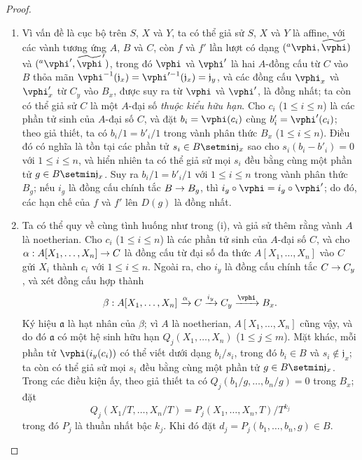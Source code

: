 \documentclass[oneside]{amsart}
\makeatletter
\renewcommand{\leq}{\leqslant}
\newcommand{\ega@arrow}[2]{\mathchoice{#1}{#2}{#2}{#2}}
\renewcommand{\to}{\ega@arrow{\longrightarrow}{\rightarrow}}
\makeatother
\begin{document}
\begin{proof}
\medskip\noindent
\begin{enumerate}
  \item[(i)] Vì vấn đề là cục bộ trên $S$, $X$ và $Y$, ta có thể giả sử $S$, $X$ và $Y$ là affine, với các vành tương ứng $A$, $B$ và $C$, còn $f$ và $f'$ lần lượt có dạng $({}^a\vphi,\widetilde{\vphi})$ và $({}^a\vphi',\widetilde{\vphi}')$, trong đó $\vphi$ và $\vphi'$ là hai $A$-đồng cấu từ $C$ vào $B$ thỏa mãn $\vphi^{-1}(\mathfrak{j}_x)=\vphi'^{-1}(\mathfrak{j}_x)=\mathfrak{j}_y$, và các đồng cấu $\vphi_x$ và $\vphi'_x$ từ $C_y$ vào $B_x$, được suy ra từ $\vphi$ và $\vphi'$, là đồng nhất;
    ta còn có thể giả sử $C$ là một $A$-đại số \emph{thuộc kiểu hữu hạn}.
    Cho $c_i$ ($1\leq i\leq n$) là các phần tử sinh của $A$-đại số $C$, và đặt $b_i=\vphi(c_i)$ cùng $b'_i=\vphi'(c_i)$;
    theo giả thiết, ta có $b_i/1=b'_i/1$ trong vành phân thức $B_x$ ($1\leq i\leq n$).
    Điều đó có nghĩa là tồn tại các phần tử $s_i\in B\setmin\mathfrak{j}_x$ sao cho $s_i(b_i-b'_i)=0$ với $1\leq i\leq n$, và hiển nhiên ta có thể giả sử mọi $s_i$ đều bằng cùng một phần tử $g\in B\setmin\mathfrak{j}_x$.
    Suy ra $b_i/1=b'_i/1$ với $1\leq i\leq n$ trong vành phân thức $B_g$;
    nếu $i_g$ là đồng cấu chính tắc $B\to B_g$, thì $i_g\circ\vphi=i_g\circ\vphi'$;
    do đó, các hạn chế của $f$ và $f'$ lên $D(g)$ là đồng nhất.
  \item[(ii)] Ta có thể quy về cùng tình huống như trong (i), và giả sử thêm rằng vành $A$ là noetherian.
    Cho $c_i$ ($1\leq i\leq n$) là các phần tử sinh của $A$-đại số $C$, và cho $\alpha:A[X_1,\ldots,X_n]\to C$ là đồng cấu từ đại số đa thức $A[X_1,\ldots,X_n]$ vào $C$ gửi $X_i$ thành $c_i$ với $1\leq i\leq n$.
    Ngoài ra, cho $i_y$ là đồng cấu chính tắc $C\to C_y$, và xét đồng cấu hợp thành
    \[
      \beta:A[X_1,\ldots,X_n] \xrightarrow{\alpha} C \xrightarrow{i_y} C_y \xrightarrow{\vphi} B_x.
    \]
    Ký hiệu $\mathfrak{a}$ là hạt nhân của $\beta$;
    vì $A$ là noetherian, $A[X_1,\ldots,X_n]$ cũng vậy, và do đó $\mathfrak{a}$ có một hệ sinh hữu hạn $Q_j(X_1,\ldots,X_n)$ ($1\leq j\leq m$).
    Mặt khác, mỗi phần tử $\vphi(i_y(c_i))$ có thể viết dưới dạng $b_i/s_i$, trong đó $b_i\in B$ và $s_i\not\in\mathfrak{j}_x$;
    ta còn có thể giả sử mọi $s_i$ đều bằng cùng một phần tử $g\in B\setmin\mathfrak{j}_x$.
    Trong các điều kiện ấy, theo giả thiết ta có $Q_j(b_1/g,\ldots,b_n/g)=0$ trong $B_x$; đặt
    \[
      Q_j(X_1/T,\ldots,X_n/T)=P_j(X_1,\ldots,X_n,T)/T^{k_j}
    \]
    trong đó $P_j$ là thuần nhất bậc $k_j$.
    Khi đó đặt $d_j=P_j(b_1,\ldots,b_n,g)\in B$.

\end{enumerate}
\end{proof}
\end{document}
